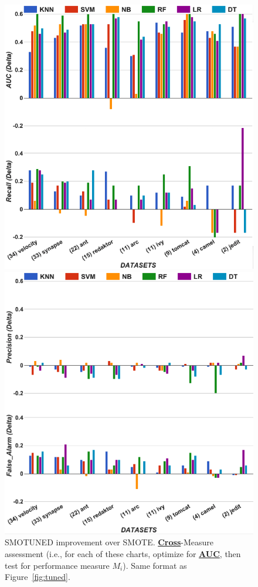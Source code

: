 \documentclass[sigconf,review, anonymous]{acmart}
\theoremstyle{break}
\theoremstyle{break}
\begin{document}
\begin{figure}[!t]
\begin{minipage}{.5\linewidth}
\centering
        \includegraphics[width=.8\linewidth,keepaspectratio,trim=0cm 1cm 0cm 2cm]{./fig/AUC_auc1.png}
    \end{minipage}%
\begin{minipage}{.5\linewidth}
        \centering
        \includegraphics[width=.8\linewidth,keepaspectratio,trim=0cm 1cm 0cm 2cm]{./fig/AUC_prec.png}
    \end{minipage}%
    
    \caption{ SMOTUNED improvement over SMOTE. 
    \underline{{\bf Cross}}-Measure
    assessment (i.e., for each of these charts,
    optimize for \underline{{\bf AUC}}, then test for
    performance measure $M_i$).  Same format as
    Figure~\ref{fig:tuned}.}
    \label{fig:auc22}
\end{figure} 
\end{document}
